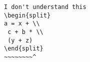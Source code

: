 \begin{verbatim}
I don't understand this
\begin{split}
a = x + \\
 c + b * \\
 (y + z)
\end{split}
~~~~~~~~^
\end{verbatim}
